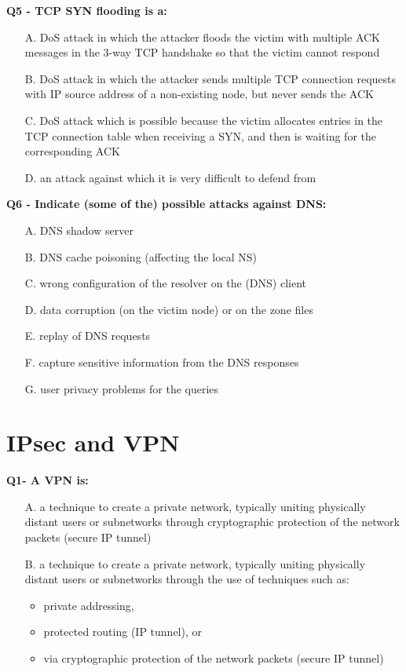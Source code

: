 \textbf{Q5 - TCP SYN flooding is a:}
\begin{itemize}
    \item[A.] DoS attack in which the attacker floods the victim with multiple ACK messages in the 3-way TCP handshake so that the victim cannot respond
    \item[B.] DoS attack in which the attacker sends multiple TCP connection requests with IP source address of a non-existing node, but never sends the ACK
    \item[C.] DoS attack which is possible because the victim allocates entries in the TCP connection table when receiving a SYN, and then is waiting for the corresponding ACK
    \item[D.] an attack against which it is very difficult to defend from
\end{itemize}

\textbf{Q6 - Indicate (some of the) possible attacks against DNS:}
\begin{itemize}
    \item[A.] DNS shadow server
    \item[B.] DNS cache poisoning (affecting the local NS)
    \item[C.] wrong configuration of the resolver on the (DNS) client
    \item[D.] data corruption (on the victim node) or on the zone files
    \item[E.] replay of DNS requests
    \item[F.] capture sensitive information from the DNS responses
    \item[G.] user privacy problems for the queries
\end{itemize}


\section*{IPsec and VPN}

\textbf{Q1- A VPN is:}
\begin{itemize}
    \item[A.] a technique to create a private network, typically uniting physically distant users or subnetworks through cryptographic protection of the network packets (secure IP tunnel)
    \item[B.] a technique to create a private network, typically uniting physically distant users or subnetworks through the use of techniques such as:
    \begin{itemize}
        \item private addressing,
        \item protected routing (IP tunnel), or
        \item via cryptographic protection of the network packets (secure IP tunnel)
    \end{itemize}
\end{itemize}

